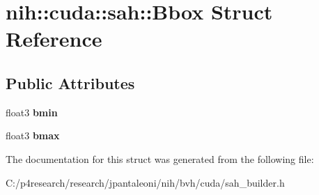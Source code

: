 \hypertarget{structnih_1_1cuda_1_1sah_1_1_bbox}{
\section{nih\-:\-:cuda\-:\-:sah\-:\-:\-Bbox \-Struct \-Reference}
\label{structnih_1_1cuda_1_1sah_1_1_bbox}
}
\subsection*{\-Public \-Attributes}
\begin{DoxyCompactItemize}
\item 
\hypertarget{structnih_1_1cuda_1_1sah_1_1_bbox_a8c21e7dd978c870d9d9d7b6b139d59a4}{
float3 {\bfseries bmin}}
\label{structnih_1_1cuda_1_1sah_1_1_bbox_a8c21e7dd978c870d9d9d7b6b139d59a4}

\item 
\hypertarget{structnih_1_1cuda_1_1sah_1_1_bbox_a991ba9a48ad4c6e02dfb92731ede9111}{
float3 {\bfseries bmax}}
\label{structnih_1_1cuda_1_1sah_1_1_bbox_a991ba9a48ad4c6e02dfb92731ede9111}

\end{DoxyCompactItemize}


\-The documentation for this struct was generated from the following file\-:\begin{DoxyCompactItemize}
\item 
\-C\-:/p4research/research/jpantaleoni/nih/bvh/cuda/sah\-\_\-builder.\-h\end{DoxyCompactItemize}
